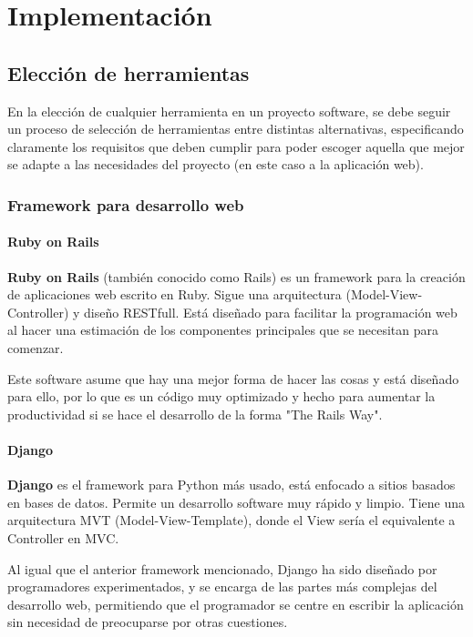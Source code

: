 \chapter{Implementación}

\section{Elección de herramientas} \label{sec:tools}
En la elección de cualquier herramienta en un proyecto software, se debe seguir un
proceso de selección de herramientas entre distintas alternativas, especificando claramente
los requisitos que deben cumplir para poder escoger aquella que mejor se adapte a las
necesidades del proyecto (en este caso a la aplicación web).

\subsection{Framework para desarrollo web}

    \subsubsection{Ruby on Rails}
    \textbf{Ruby on Rails} (también conocido como Rails) \cite{ruby-on-rails} es un framework
    para la creación de aplicaciones web escrito en Ruby. Sigue una arquitectura
    (Model-View-Controller) y diseño RESTfull. Está diseñado para facilitar la programación
    web al hacer una estimación de los componentes principales que se necesitan para comenzar.

    Este software asume que hay una mejor forma de hacer las cosas y está diseñado para
    ello, por lo que es un código muy optimizado y hecho para aumentar la productividad
    si se hace el desarrollo de la forma "The Rails Way".

    \subsubsection{Django}
    \textbf{Django} \cite{django} es el framework para Python más usado, está enfocado a sitios
    basados en bases de datos. Permite un desarrollo software muy rápido y limpio. Tiene una
    arquitectura MVT (Model-View-Template), donde el View sería el equivalente a Controller
    en MVC.

    Al igual que el anterior framework mencionado, Django ha sido diseñado por programadores
    experimentados, y se encarga de las partes más complejas del desarrollo web, permitiendo
    que el programador se centre en escribir la aplicación sin necesidad de preocuparse
    por otras cuestiones.

